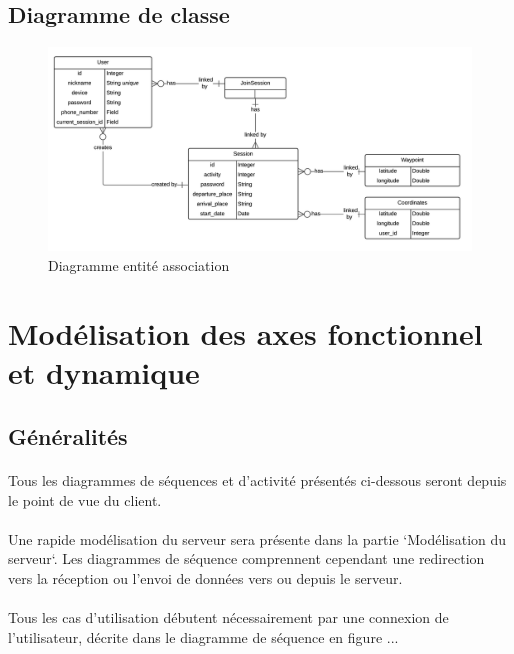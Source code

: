 \documentclass[titlepage, 12pt]{report}
\begin{document}
\subsection{Diagramme de classe}


\begin{figure}[!h]
	\caption{Diagramme entité association}
	\label{database_ERD}
	\centering
	\includegraphics[scale=0.7]{Images/diagram/database_ERD.png}
\end{figure}

\section{Modélisation des axes fonctionnel et dynamique}

\subsection{Généralités}

\paragraph{}Tous les diagrammes de séquences et d'activité présentés ci-dessous seront depuis le point de vue du client.
\paragraph{}Une rapide modélisation du serveur sera présente dans la partie `Modélisation du serveur`. Les diagrammes de séquence comprennent cependant une redirection vers la réception ou l'envoi de données vers ou depuis le serveur.
\paragraph{}Tous les cas d'utilisation débutent nécessairement par une connexion de l'utilisateur,  décrite dans le diagramme de séquence en figure ...
\end{document}
